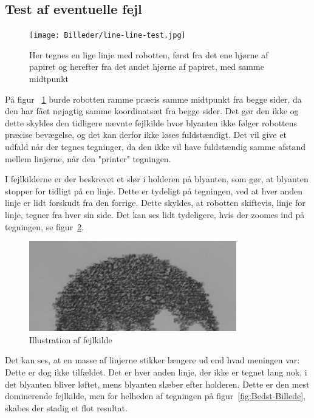 \subsection{Test af eventuelle fejl}
 
\begin{figure}[h]
	\begin{center}
		\texttt{[image: Billeder/line-line-test.jpg]}
		\caption{Her tegnes en lige linje med robotten, først fra det ene hjørne af papiret og herefter fra det andet hjørne af papiret, med samme midtpunkt}\label{fig:line-line-test}
	\end{center}
\end{figure}
På figur ~\ref{fig:line-line-test} burde robotten ramme præcis samme midtpunkt fra begge sider, da den har fået nøjagtig samme koordinatsæt fra begge sider. Det gør den ikke og dette skyldes den tidligere nævnte fejlkilde hvor blyanten ikke følger robottens præcise bevægelse, og det kan derfor ikke løses fuldstændigt. Det vil give et udfald når der tegnes tegninger, da den ikke vil have fuldstændig samme afstand mellem linjerne, når den "printer" tegningen. 

I fejlkilderne er der beskrevet et slør i holderen på blyanten, som gør, at blyanten stopper for tidligt på en linje. Dette er tydeligt på tegningen, ved at hver anden linje er lidt forskudt fra den forrige. Dette skyldes, at robotten skiftevis, linje for linje, tegner fra hver sin side. Det kan ses lidt tydeligere, hvis der zoomes ind på tegningen, se figur~\ref{fig:haar}.\\
\begin{figure}[h]
	\begin{center}
	\includegraphics[scale=0.5]{Billeder/Williamhaar.png}
	\caption[caption]{Illustration af fejlkilde}
	\label{fig:haar}
	\end{center}
\end{figure} 
Det kan ses, at en masse af linjerne stikker længere ud end hvad meningen var: Dette er dog ikke tilfældet. Det er hver anden linje, der ikke er tegnet lang nok, i det blyanten bliver løftet, mens blyanten slæber efter holderen. Dette er den mest dominerende fejlkilde, men for helheden af tegningen på figur~\ref{fig:Bedst-Billede}, skabes der stadig et flot resultat.